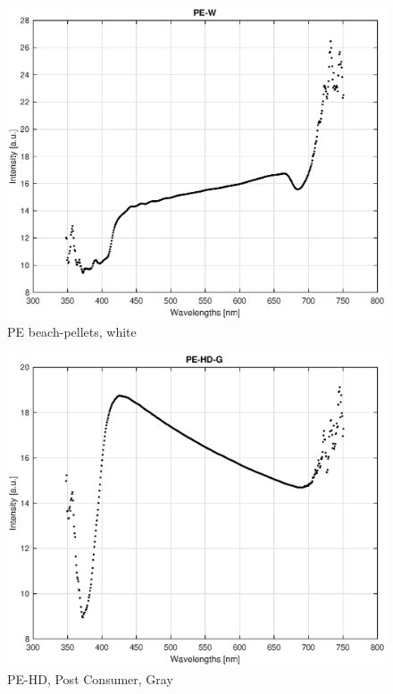 \begin{appendices}
\begin{figure}
    \centering
    \includegraphics[width = 12cm]{Images/appendix/pe-beach-white.eps}
    \caption{PE beach-pellets, white}
    \label{fig:pe_beach_w}
\end{figure}

\begin{figure}
    \centering
    \includegraphics[width = 12cm]{Images/appendix/pe-hd-postconsum-gray.eps}
    \caption{PE-HD, Post Consumer, Gray}
    \label{fig:pehd-gray}
\end{figure}


\end{appendices}
